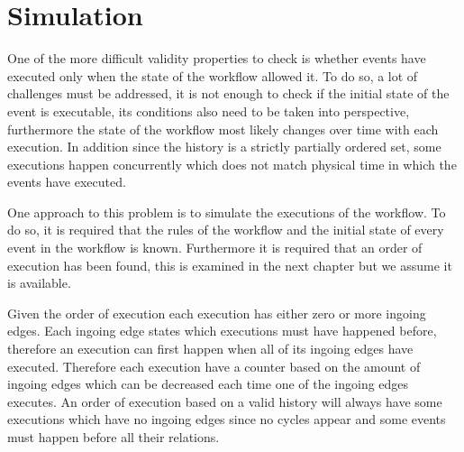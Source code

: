 
    \section{Simulation}\label{sec:historyindcr:simulation}
    One of the more difficult validity properties to check is whether events have executed only when the state of the workflow allowed it. To do so, a lot of challenges must be addressed, it is not enough to check if the initial state of the event is executable, its conditions also need to be taken into perspective, furthermore the state of the workflow most likely changes over time with each execution. In addition since the history is a strictly partially ordered set, some executions happen concurrently which does not match physical time in which the events have executed.
    
    \newpar One approach to this problem is to simulate the executions of the workflow. To do so, it is required that the rules of the workflow and the initial state of every event in the workflow is known. Furthermore it is required that an order of execution has been found, this is examined in the next chapter but we assume it is available. 
    
    Given the order of execution each execution has either zero or more ingoing edges. Each ingoing edge states which executions must have happened before, therefore an execution can first happen when all of its ingoing edges have executed. Therefore each execution have a counter based on the amount of ingoing edges which can be decreased each time one of the ingoing edges executes. An order of execution based on a valid history will always have some executions which have no ingoing edges since no cycles appear and some events must happen before all their relations.
    
